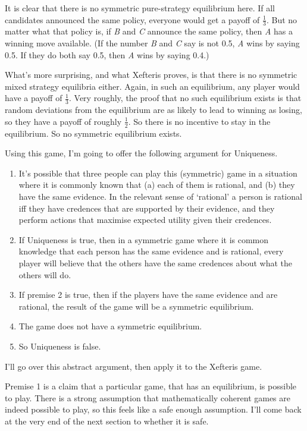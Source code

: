 \documentclass[
  12pt,
  letterpaper,
  DIV=11,
  numbers=noendperiod]{scrreprt}
\providecommand{\tightlist}{%
  \setlength{\itemsep}{0pt}\setlength{\parskip}{0pt}}\usepackage{longtable,booktabs,array}
\begin{document}
It is clear that there is no symmetric pure-strategy equilibrium here.
If all candidates announced the same policy, everyone would get a payoff
of \(\frac{1}{3}\). But no matter what that policy is, if \emph{B} and
\emph{C} announce the same policy, then \emph{A} has a winning move
available. (If the number \emph{B} and \emph{C} say is not 0.5, \emph{A}
wins by saying 0.5. If they do both say 0.5, then \emph{A} wins by
saying 0.4.)

What's more surprising, and what Xefteris proves, is that there is no
symmetric mixed strategy equilibria either. Again, in such an
equilibrium, any player would have a payoff of \(\frac{1}{3}\). Very
roughly, the proof that no such equilibrium exists is that random
deviations from the equilibrium are as likely to lead to winning as
losing, so they have a payoff of roughly \(\frac{1}{2}\). So there is no
incentive to stay in the equilibrium. So no symmetric equilibrium
exists.

Using this game, I'm going to offer the following argument for
Uniqueness.

\begin{enumerate}
\def\labelenumi{\arabic{enumi}.}
\tightlist
\item
  It's possible that three people can play this (symmetric) game in a
  situation where it is commonly known that (a) each of them is
  rational, and (b) they have the same evidence. In the relevant sense
  of `rational' a person is rational iff they have credences that are
  supported by their evidence, and they perform actions that maximise
  expected utility given their credences.
\item
  If Uniqueness is true, then in a symmetric game where it is common
  knowledge that each person has the same evidence and is rational,
  every player will believe that the others have the same credences
  about what the others will do.
\item
  If premise 2 is true, then if the players have the same evidence and
  are rational, the result of the game will be a symmetric equilibrium.
\item
  The game does not have a symmetric equilibrium.
\item
  So Uniqueness is false.
\end{enumerate}

I'll go over this abstract argument, then apply it to the Xefteris game.

Premise 1 is a claim that a particular game, that has an equilibrium, is
possible to play. There is a strong assumption that mathematically
coherent games are indeed possible to play, so this feels like a safe
enough assumption. I'll come back at the very end of the next section to
whether it is safe.
\end{document}
